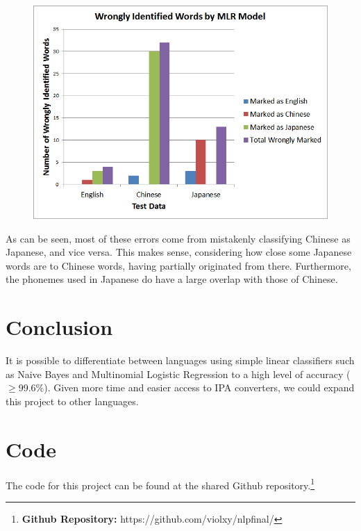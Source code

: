 \documentclass[a4paper]{article}
\begin{document}
\begin{figure}[H]
\centering
\includegraphics[width=\textwidth]{mlrgraph.png}
\end{figure}
As can be seen, most of these errors come from mistakenly classifying Chinese as Japanese, and vice versa. This makes sense, considering how close some Japanese words are to Chinese words, having partially originated from there. Furthermore, the phonemes used in Japanese do have a large overlap with those of Chinese.
\section{Conclusion}
It is possible to differentiate between languages using simple linear classifiers such as Naive Bayes and Multinomial Logistic Regression to a high level of accuracy ($\ge$99.6\%). Given more time and easier access to IPA converters, we could expand this project to other languages.\\
\section{Code}
The code for this project can be found at the shared Github repository.\footnote{\textbf{Github Repository: }https://github.com/violxy/nlpfinal/}
\end{document}

